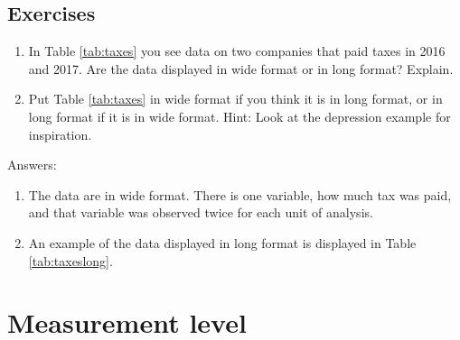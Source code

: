 \subsection{Exercises}


\begin{enumerate}

\item In Table \ref{tab:taxes} you see data on two companies that paid taxes in 2016 and 2017. Are the data displayed in wide format or in long format? Explain.

\begin{kframe}


{\ttfamily\noindent\bfseries{}}\end{kframe}

\item Put Table \ref{tab:taxes} in wide format if you think it is in long format, or in long format if it is in wide format. Hint: Look at the depression example for inspiration.



\end{enumerate}

Answers:

\begin{enumerate}

\item The data are in wide format. There is one variable, how much tax was paid, and that variable was observed twice for each unit of analysis.



\item An example of the data displayed in long format is displayed in Table \ref{tab:taxeslong}.

\begin{kframe}


{\ttfamily\noindent\bfseries{}}\end{kframe}

\end{enumerate}




\section{Measurement level}


